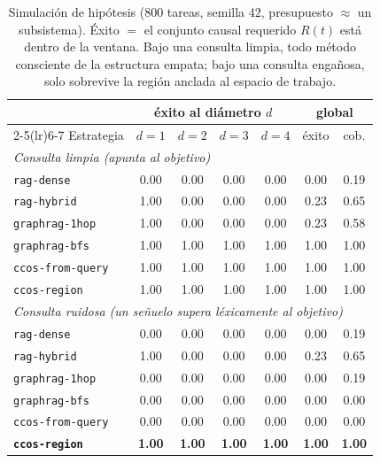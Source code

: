 \documentclass[11pt]{article}
\newcommand{\code}[1]{\texttt{#1}}
\begin{document}
\begin{table}[h]
\centering
\begin{tabular}{lcccccc}
\toprule
& \multicolumn{4}{c}{éxito al diámetro $d$} & \multicolumn{2}{c}{global} \\
\cmidrule(lr){2-5}\cmidrule(lr){6-7}
Estrategia & $d{=}1$ & $d{=}2$ & $d{=}3$ & $d{=}4$ & éxito & cob. \\
\midrule
\multicolumn{7}{l}{\emph{Consulta limpia (apunta al objetivo)}}\\
\code{rag-dense}      & 0.00 & 0.00 & 0.00 & 0.00 & 0.00 & 0.19 \\
\code{rag-hybrid}     & 1.00 & 0.00 & 0.00 & 0.00 & 0.23 & 0.65 \\
\code{graphrag-1hop}  & 1.00 & 0.00 & 0.00 & 0.00 & 0.23 & 0.58 \\
\code{graphrag-bfs}   & 1.00 & 1.00 & 1.00 & 1.00 & 1.00 & 1.00 \\
\code{ccos-from-query}& 1.00 & 1.00 & 1.00 & 1.00 & 1.00 & 1.00 \\
\code{ccos-region}    & 1.00 & 1.00 & 1.00 & 1.00 & 1.00 & 1.00 \\
\midrule
\multicolumn{7}{l}{\emph{Consulta ruidosa (un señuelo supera léxicamente al objetivo)}}\\
\code{rag-dense}      & 0.00 & 0.00 & 0.00 & 0.00 & 0.00 & 0.19 \\
\code{rag-hybrid}     & 1.00 & 0.00 & 0.00 & 0.00 & 0.23 & 0.65 \\
\code{graphrag-1hop}  & 0.00 & 0.00 & 0.00 & 0.00 & 0.00 & 0.19 \\
\code{graphrag-bfs}   & 0.00 & 0.00 & 0.00 & 0.00 & 0.00 & 0.00 \\
\code{ccos-from-query}& 0.00 & 0.00 & 0.00 & 0.00 & 0.00 & 0.00 \\
\textbf{\code{ccos-region}} & \textbf{1.00} & \textbf{1.00} & \textbf{1.00} & \textbf{1.00} & \textbf{1.00} & \textbf{1.00} \\
\bottomrule
\end{tabular}
\caption{Simulación de hipótesis ($800$ tareas, semilla $42$, presupuesto $\approx$ un
subsistema). Éxito $=$ el conjunto causal requerido $R(t)$ está dentro de la ventana.
Bajo una consulta limpia, todo método consciente de la estructura empata; bajo una
consulta engañosa, solo sobrevive la región anclada al espacio de trabajo.}
\label{tab:sim}
\end{table}
\end{document}
